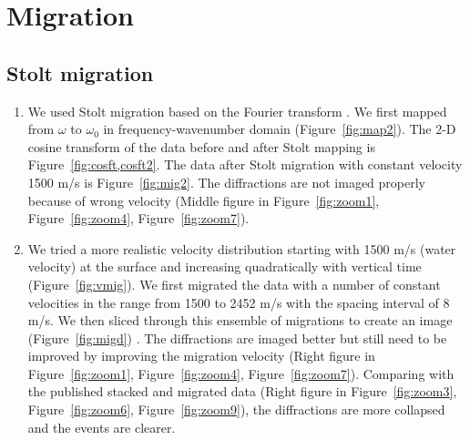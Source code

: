 \section{Migration}

\subsection{Stolt migration}

\begin{enumerate}
 
\item We used Stolt migration based on the Fourier transform \cite[]{GEO50-11-22192244}. We first mapped from $\omega$ to $\omega_0$ in frequency-wavenumber domain (Figure~\ref{fig:map2}). The 2-D cosine transform of the data before and after Stolt mapping is Figure~\ref{fig:cosft,cosft2}. The data after Stolt migration with constant velocity 1500 m/s is Figure~\ref{fig:mig2}. The diffractions are not imaged properly because of wrong velocity (Middle figure in Figure~\ref{fig:zoom1}, Figure~\ref{fig:zoom4}, Figure~\ref{fig:zoom7}). 

\item We tried a more realistic velocity distribution starting with 1500 m/s (water velocity) at the surface and increasing quadratically with vertical time (Figure~\ref{fig:vmig}). We first migrated the data with a number of constant velocities in the range from 1500 to 2452 m/s with the spacing interval of 8 m/s. We then sliced through this ensemble of migrations to create an image (Figure~\ref{fig:migd}) \cite[]{GEO57-01-00510059}. The diffractions are imaged better but still need to be improved by improving the migration velocity (Right figure in Figure~\ref{fig:zoom1}, Figure~\ref{fig:zoom4}, Figure~\ref{fig:zoom7}). Comparing with the published stacked and migrated data (Right figure in Figure~\ref{fig:zoom3}, Figure~\ref{fig:zoom6}, Figure~\ref{fig:zoom9}), the diffractions are more collapsed and the events are clearer.


\end{enumerate}\clearpage

